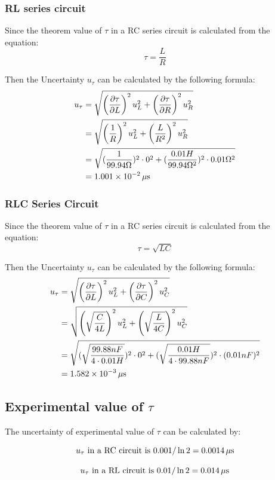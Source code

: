 \documentclass[12pt, a4paper]{article}
\begin{document}
\subsubsection{RL series circuit}
Since the theorem value of $\tau$ in a RC series circuit is calculated from the equation:
$$\tau = \frac{L}{R}$$

Then the Uncertainty $u_{\tau}$ can be calculated by the following formula:
\begin{align*}
	u_{\tau}&=\sqrt{\left(\frac{\partial \tau}{\partial L}\right)^2u_L^2+\left(\frac{\partial \tau}{\partial R}\right)^2u_R^2}\\
	&=\sqrt{\left(\frac{1}{R}\right)^2u_L^2+\left(\frac{L}{R^2}\right)^2u_R^2}\\
	&=\sqrt{(\frac{1}{99.94\Omega})^2\cdot 0^2 + (\frac{0.01H}{99.94\Omega^2})^2\cdot 0.01\Omega^2}  \\
	&=1.001\times10^{-2}\,\rm{\mu s}
\end{align*}

\subsubsection{RLC Series Circuit}
Since the theorem value of $\tau$ in a RC series circuit is calculated from the equation:
$$\tau = \sqrt{LC}$$

Then the Uncertainty $u_{\tau}$ can be calculated by the following formula:
\begin{align*}
	u_{\tau}&=\sqrt{\left(\frac{\partial \tau}{\partial L}\right)^2u_L^2+\left(\frac{\partial \tau}{\partial C}\right)^2u_C^2}\\
	&=\sqrt{\left(\sqrt{\frac{C}{4L}}\right)^2u_L^2+\left(\sqrt{\frac{L}{4C}}\right)^2u_C^2}\\
	&=\sqrt{(\sqrt{\frac{99.88nF}{4\cdot 0.01H}})^2\cdot 0^2 + (\sqrt{\frac{0.01H}{4\cdot 99.88nF}})^2\cdot (0.01nF)^2}\\
	&=1.582\times10^{-3}\,\rm{\mu s}
\end{align*}

\subsection{Experimental value of $\tau$}
The uncertainty of experimental value of $\tau$ can be calculated by:

$$u_{\tau} \text{ in a RC circuit is } 0.001/\ln2=0.0014\,\rm{\mu s}$$

$$u_{\tau} \text{ in a RL circuit is } 0.01/\ln2=0.014\,\rm{\mu s}$$
\end{document}
